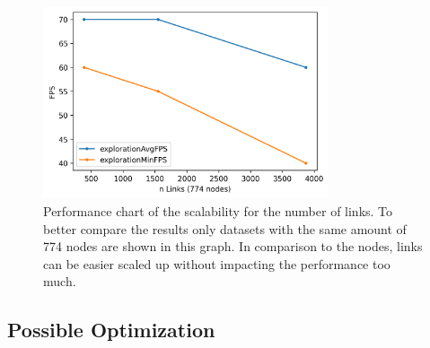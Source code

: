 \begin{figure}[!hbt]
    \centering
    \includegraphics[width=0.75\textwidth]{graphics/performanceAnalysisLinks2.png}
    \caption[Performance chart of the scalability for the number of links.]{Performance chart of the scalability for the number of links. To better compare the results only datasets with the same amount of 774 nodes are shown in this graph. In comparison to the nodes, links can be easier scaled up without impacting the performance too much.} 
    \label{fig:performanceLinks} 
\end{figure}
\pagebreak
\subsection{Possible Optimization}

